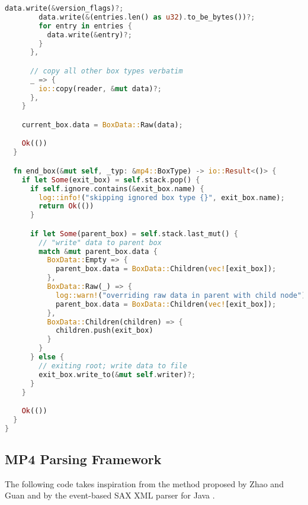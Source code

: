 \begin{lstlisting}[language=Rust]
        data.write(&version_flags)?;
        data.write(&(entries.len() as u32).to_be_bytes())?;
        for entry in entries {
          data.write(&entry)?;
        }
      },

      // copy all other box types verbatim
      _ => {
        io::copy(reader, &mut data)?;
      },
    }

    current_box.data = BoxData::Raw(data);

    Ok(())
  }

  fn end_box(&mut self, _typ: &mp4::BoxType) -> io::Result<()> {
    if let Some(exit_box) = self.stack.pop() {
      if self.ignore.contains(&exit_box.name) {
        log::info!("skipping ignored box type {}", exit_box.name);
        return Ok(())
      }

      if let Some(parent_box) = self.stack.last_mut() {
        // "write" data to parent box
        match &mut parent_box.data {
          BoxData::Empty => {
            parent_box.data = BoxData::Children(vec![exit_box]);
          },
          BoxData::Raw(_) => {
            log::warn!("overriding raw data in parent with child node");
            parent_box.data = BoxData::Children(vec![exit_box]);
          },
          BoxData::Children(children) => {
            children.push(exit_box)
          }
        }
      } else {
        // exiting root; write data to file
        exit_box.write_to(&mut self.writer)?;
      }
    }

    Ok(())
  }
}
\end{lstlisting}

\newpage

\subsection{MP4 Parsing Framework}
\label{sec:mp4-sax}

The following code takes inspiration from the method proposed by Zhao and Guan \cite{zhao2010} and by the event-based SAX XML parser for Java \cite{fegaras2004}.

